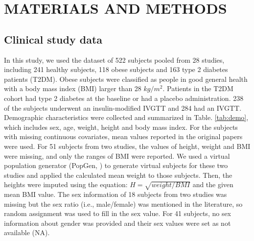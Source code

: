 \documentclass[utf8]{frontiersSCNS} %
\begin{document}
\section{MATERIALS AND METHODS}

\subsection{Clinical study data}
In this study, we used the dataset of 522 subjects pooled from 28 studies, including 241 healthy subjects, 118 obese subjects and 163 type 2 diabetes patients (T2DM). Obese subjects were classified as people in good general health with a body mass index (BMI) larger than 28 $kg/m^2$. Patients in the T2DM cohort had type 2 diabetes at the baseline or had a placebo administration. 238 of the subjects underwent an insulin-modified IVGTT and 284 had an IVGTT. Demographic characteristics were collected and summarized in Table. \ref{tab:demo}, which includes sex, age, weight, height and body mass index. For the subjects with missing continuous covariates, mean values reported in the original papers were used. For 51 subjects from two studies, the values of height, weight and BMI were missing, and only the ranges of BMI were reported. We used a virtual population generator (PopGen, \cite{McNally2015}) to generate virtual subjects for these two studies and applied the calculated mean weight to those subjects. Then, the heights were imputed using the equation: $H=\sqrt{weight/BMI}$ and the given mean BMI value. The sex information of 18 subjects from two studies was missing but the sex ratio (i.e., male/female) was mentioned in the literature, so random assignment was used to fill in the sex value. For 41 subjects, no sex information about gender was provided and their sex values were set as not available (NA).
\end{document}
